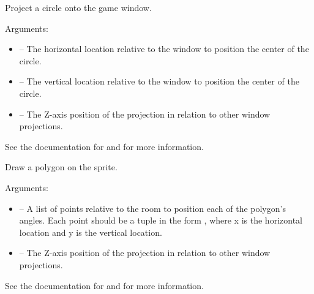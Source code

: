 \documentclass[letterpaper,10pt,english]{sphinxmanual}
\begin{document}
\begin{fulllineitems}
\label{dsp:sge.dsp.Game.project_circle}
Project a circle onto the game window.

Arguments:
\begin{itemize}
\item {} 
 -- The horizontal location relative to the window to
position the center of the circle.

\item {} 
 -- The vertical location relative to the window to
position the center of the circle.

\item {} 
 -- The Z-axis position of the projection in relation to
other window projections.

\end{itemize}

See the documentation for {\hyperref[gfx:sge.gfx.Sprite.draw_circle]{\emph{}}} and
{\hyperref[dsp:sge.dsp.Game.project_dot]{\emph{}}} for more information.

\end{fulllineitems}


\begin{fulllineitems}
\label{dsp:sge.dsp.Game.project_polygon}
Draw a polygon on the sprite.

Arguments:
\begin{itemize}
\item {} 
 -- A list of points relative to the room to
position each of the polygon's angles.  Each point should be a
tuple in the form , where x is the horizontal
location and y is the vertical location.

\item {} 
 -- The Z-axis position of the projection in relation to
other window projections.

\end{itemize}

See the documentation for {\hyperref[gfx:sge.gfx.Sprite.draw_polygon]{\emph{}}}
and {\hyperref[dsp:sge.dsp.Game.project_dot]{\emph{}}} for more information.

\end{fulllineitems}
\end{document}
